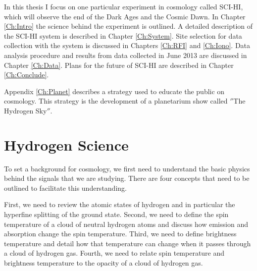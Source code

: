 In this thesis I focus on one particular experiment in \cm cosmology called SCI-HI, which will observe the end of the Dark Ages and the Cosmic Dawn. In Chapter \ref{Ch:Intro} the science behind the experiment is outlined. A detailed description of the SCI-HI system is described in Chapter \ref{Ch:System}. Site selection for data collection with the system is discussed in Chapters \ref{Ch:RFI} and \ref{Ch:Iono}. Data analysis procedure and results from data collected in June 2013 are discussed in Chapter \ref{Ch:Data}. Plans for the future of SCI-HI are described in Chapter \ref{Ch:Conclude}. 

Appendix \ref{Ch:Planet} describes a strategy used to educate the public on \cm cosmology. This strategy is the development of a planetarium show called $''$The Hydrogen Sky$''$. 



\section{Hydrogen \cm Science}

To set a background for \cm cosmology, we first need to understand the basic physics behind the signals that we are studying. There are four concepts that need to be outlined to facilitate this understanding. 

First, we need to review the atomic states of hydrogen and in particular the \cm hyperfine splitting of the ground state. Second, we need to define the spin temperature of a cloud of neutral hydrogen atoms and discuss how emission and absorption change the spin temperature. Third, we need to define brightness temperature and detail how that temperature can change when it passes through a cloud of hydrogen gas. Fourth, we need to relate spin temperature and brightness temperature to the opacity of a cloud of hydrogen gas. 


